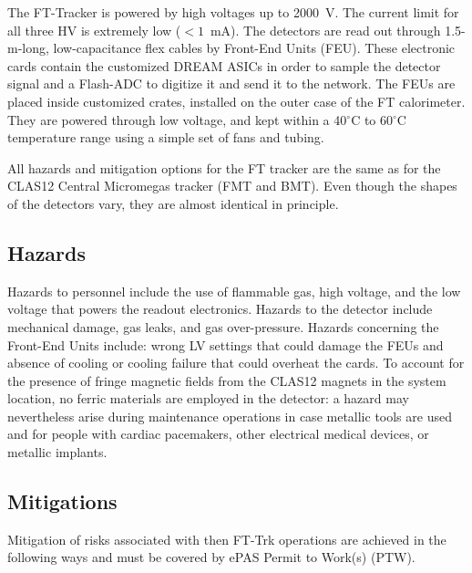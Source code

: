 The FT-Tracker is powered by high voltages up to 2000~V. The current limit for all three HV is 
extremely low ($< 1$~mA). The detectors are read out through 1.5-m-long, low-capacitance flex 
cables by Front-End Units (FEU). These electronic cards contain the customized DREAM ASICs in 
order to sample the detector signal and a Flash-ADC to digitize it and send it to the network. 
The FEUs are placed inside customized crates, installed on the outer case of the FT calorimeter. 
They are powered through low voltage, and kept within a 40$^\circ$C to 60$^\circ$C temperature 
range using a simple set of fans and tubing.

All hazards and mitigation options for the FT tracker are the same as for the CLAS12 Central 
Micromegas tracker (FMT and BMT). Even though the shapes of the detectors vary, they are almost 
identical in principle. 

\subsection{Hazards}

Hazards to personnel include the use of flammable gas, high voltage, and the low voltage that 
powers the readout electronics. Hazards to the detector include mechanical damage, gas leaks, 
and gas over-pressure. Hazards concerning the Front-End Units include: wrong LV settings that 
could damage the FEUs and absence of cooling or cooling failure that could overheat the cards. 
To account for the presence of fringe magnetic fields from the CLAS12 magnets in the system 
location, no ferric materials are employed in the detector: a hazard may nevertheless arise 
during maintenance operations in case metallic tools are used and for people with cardiac 
pacemakers, other electrical medical devices, or metallic implants.

\subsection{Mitigations}

Mitigation of risks associated with then FT-Trk operations are achieved in the following ways
and must be covered by ePAS Permit to Work(s) (PTW).

